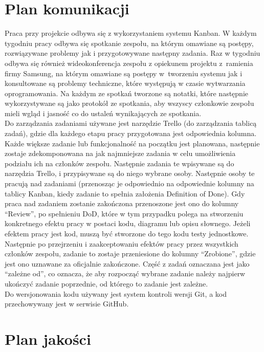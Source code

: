 \documentclass{article}
\begin{document}
\section{Plan komunikacji}
Praca przy projekcie odbywa się z wykorzystaniem systemu Kanban. W każdym tygodniu pracy odbywa się spotkanie zespołu, na którym omawiane są postępy, rozwiązywane problemy jak i przygotowywane następny zadania. Raz w tygodniu odbywa się również wideokonferencja zespołu z opiekunem projektu z~ramienia firmy Samsung, na którym omawiane są postępy w~tworzeniu systemu jak i konsultowane są problemy techniczne, które występują w czasie wytwarzania oprogramowania. 
Na każdym ze spotkań tworzone są notatki, które następnie wykorzystywane są jako protokół ze spotkania, aby wszyscy członkowie zespołu mieli wgląd i jasność co do ustaleń wynikających ze spotkania. \mbox{}\\
Do zarządzania zadaniami \nobreak używane jest narzędzie Trello (do zarządzania tablicą zadań), gdzie dla każdego etapu pracy przygotowana jest \nobreak odpowiednia kolumna. Każde większe zadanie lub funkcjonalność na początku jest planowana, następnie zostaje zdekomponowana na jak najmniejsze zadania w celu umożliwienia podziału ich na członków zespołu. \nobreak Następnie zadania te wpisywane są do narzędzia Trello, i przypisywane są do niego wybrane osoby. Następnie osoby te pracują nad zadaniami (przenosząc je odpowiednio na odpowiednie kolumny na tablicy Kanban, kiedy zadanie to spełnia założenia Definition of Done). Gdy praca nad zadaniem zostanie zakończona przenoszone jest ono do kolumny “Review”, po spełnieniu DoD, które w tym przypadku polega na stworzeniu konkretnego efektu pracy w postaci kodu, diagramu lub opisu słownego. Jeżeli efektem pracy jest kod, muszą być stworzone do tego kodu testy jednostkowe. Następnie po przejrzeniu i zaakceptowaniu efektów pracy przez wszystkich członków zespołu, zadanie to zostaje przeniesione do kolumny “Zrobione”, gdzie jest ono uznawane za oficjalnie zakończone. Część z zadań oznaczana jest jako “zależne od”, co oznacza, że aby rozpocząć wybrane zadanie należy najpierw ukończyć zadanie poprzednie, od którego to zadanie jest zależne. \\
Do wersjonowania kodu używany jest system kontroli wersji Git, a kod przechowywany jest w serwisie \nobreak GitHub.

\section{Plan jakości}
\end{document}

